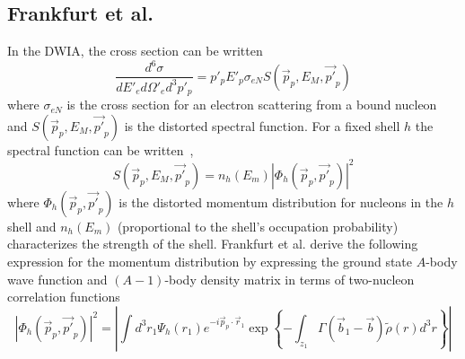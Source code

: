 \subsection{Frankfurt et al.}



In the DWIA, the cross section can be written
\begin{equation}
    \frac{d^6\sigma}{dE'_{e} d\Omega'_{e} d^3p'_{p}} = p'_p E'_p \sigma_{eN} S(\vec{p}_p, E_M, \vec{p'}_p)
\end{equation}
where $\sigma_{eN}$ is the cross section for an electron scattering from a
bound nucleon and $S(\vec{p}_p, E_M, \vec{p'}_p)$ is the distorted
spectral function.
For a fixed shell $h$ the spectral function can be written~\cite{Frullani_1984},
\begin{equation}
    S(\vec{p}_p, E_M, \vec{p'}_p) = n_h(E_m) |\Phi_h(\vec{p}_p, \vec{p'}_p)|^2
\end{equation}
where $\Phi_h(\vec{p}_p, \vec{p'}_p)$ is the distorted momentum distribution for
nucleons in the $h$ shell
and
$n_h(E_m)$ (proportional to the shell's occupation probability) characterizes
the strength of the shell.
Frankfurt et al. derive the following expression for the momentum distribution
by expressing the ground state $A$-body wave function and $(A-1)$-body density
matrix in terms of two-nucleon correlation functions
\begin{equation}
    \left| \Phi_h(\vec{p}_p, \vec{p'}_p)\right|^2
        = \left|
            \int d^3 r_1 \Psi_h(r_1) e^{-i \vec{p}_p \cdot \vec{r}_1}
            \exp{\left\{- \int_{z_{1}} \Gamma\left(\vec{b}_1-\vec{b}\right) \tilde{\rho}(r) d^3 r\right\}}
          \right|
\end{equation}

